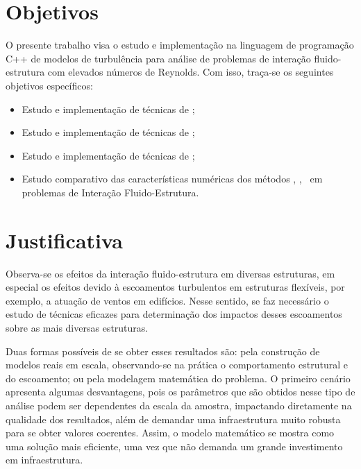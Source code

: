 \section{Objetivos}

O presente trabalho visa o estudo e implementação na linguagem de programação C++ de modelos de turbulência para análise de problemas de interação fluido-estrutura com elevados números de Reynolds. Com isso, traça-se os seguintes objetivos específicos:

\begin{itemize}
    \item Estudo e implementação de técnicas de \RANS;

    \item Estudo e implementação de técnicas de \LES;

    \item Estudo e implementação de técnicas de \VMS;

    \item Estudo comparativo das características numéricas dos métodos \RANS, \LES, \VMS\ em problemas de Interação Fluido-Estrutura.
\end{itemize}

\section{Justificativa}

Observa-se os efeitos da interação fluido-estrutura em diversas estruturas, em especial os efeitos devido à escoamentos turbulentos em estruturas flexíveis, por exemplo, a atuação de ventos em edifícios. Nesse sentido, se faz necessário o estudo de técnicas eficazes para determinação dos impactos desses escoamentos sobre as mais diversas estruturas.

Duas formas possíveis de se obter esses resultados são: pela construção de modelos reais em escala, observando-se na prática o comportamento estrutural e do escoamento; ou pela modelagem matemática do problema. O primeiro cenário apresenta algumas desvantagens, pois os parâmetros que são obtidos nesse tipo de análise podem ser dependentes da escala da amostra, impactando diretamente na qualidade dos resultados, além de demandar uma infraestrutura muito robusta para se obter valores coerentes. Assim, o modelo matemático se mostra como uma solução mais eficiente, uma vez que não demanda um grande investimento em infraestrutura.

